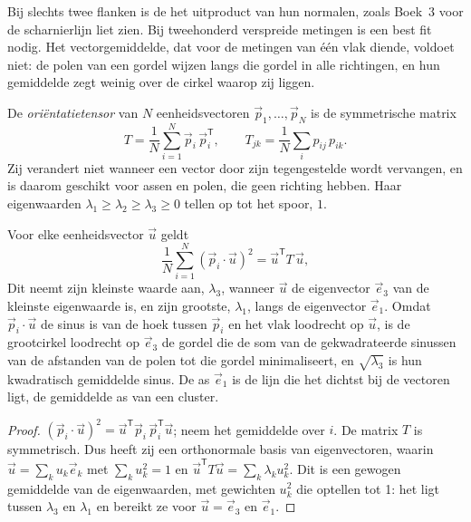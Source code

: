 Bij slechts twee flanken is de  het uitproduct van hun normalen,
zoals Boek~3 voor de scharnierlijn liet zien. Bij tweehonderd verspreide
metingen is een best fit nodig. Het vectorgemiddelde, dat voor de metingen
van één vlak diende, voldoet niet: de polen van een gordel wijzen langs die gordel in alle richtingen, en
hun gemiddelde zegt weinig over de cirkel waarop zij liggen.

\begin{definition}[Oriëntatietensor]\label{def:b3:structural-analysis:orientation-tensor}
De \emph{oriëntatietensor} van $N$ eenheidsvectoren
$\vec p_1, \dots, \vec p_N$ is de symmetrische matrix
\[
  T = \frac1N\sum_{i=1}^N \vec p_i\,\vec p_i^{\mathsf T},
  \qquad T_{jk} = \frac1N\sum_i p_{ij}\,p_{ik} .
\]
Zij verandert niet wanneer een vector door zijn tegengestelde wordt vervangen, en is daarom geschikt voor
assen en polen, die geen richting hebben. Haar eigenwaarden $\lambda_1 \ge \lambda_2
\ge \lambda_3 \ge 0$ tellen op tot het spoor, $1$.
\end{definition}

\begin{theorem}\label{thm:b3:structural-analysis:tensor}
Voor elke eenheidsvector $\vec u$ geldt
\[
  \frac1N\sum_{i=1}^N (\vec p_i\cdot\vec u)^2 = \vec u^{\mathsf T}T\,\vec u ,
\]
Dit neemt zijn kleinste waarde aan, $\lambda_3$, wanneer $\vec u$ de eigenvector
$\vec e_3$ van de kleinste eigenwaarde is, en zijn grootste, $\lambda_1$, langs de
eigenvector $\vec e_1$. Omdat $\vec p_i\cdot\vec u$ de sinus is van de hoek
tussen $\vec p_i$ en het vlak loodrecht op $\vec u$, is de grootcirkel
loodrecht op $\vec e_3$ de gordel die de som van de gekwadrateerde
sinussen van de afstanden van de polen tot die gordel minimaliseert, en $\sqrt{\lambda_3}$ is hun
kwadratisch gemiddelde sinus. De as $\vec e_1$ is de lijn die het dichtst bij de vectoren ligt,
de gemiddelde as van een cluster.
\end{theorem}

\begin{proof}
$(\vec p_i\cdot\vec u)^2 = \vec u^{\mathsf T}\vec p_i\,\vec p_i^{\mathsf T}\vec
u$; neem het gemiddelde over $i$. De matrix $T$ is symmetrisch. Dus heeft zij een orthonormale
basis van eigenvectoren, waarin $\vec u = \sum_k u_k\vec e_k$ met $\sum_k
u_k^2 = 1$ en $\vec u^{\mathsf T}T\vec u = \sum_k\lambda_k u_k^2$. Dit is een
gewogen gemiddelde van de eigenwaarden, met gewichten $u_k^2$ die optellen tot 1: het
ligt tussen $\lambda_3$ en $\lambda_1$ en bereikt ze voor $\vec u = \vec
e_3$ en $\vec e_1$.
\end{proof}

